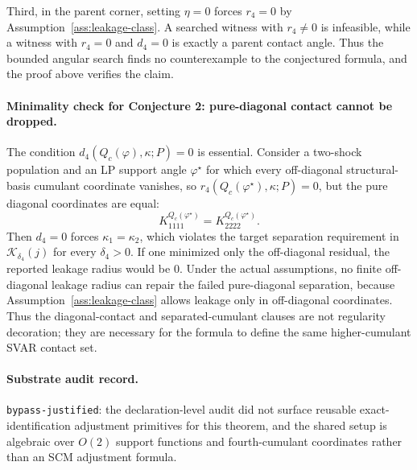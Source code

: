 \documentclass[11pt]{article}
\theoremstyle{definition}
\theoremstyle{plain}
\theoremstyle{remark}
\begin{document}
Third, in the parent corner, setting \(\eta=0\) forces \(r_4=0\) by Assumption~\ref{ass:leakage-class}.  A searched witness with \(r_4\ne0\) is infeasible, while a witness with \(r_4=0\) and \(d_4=0\) is exactly a parent contact angle.  Thus the bounded angular search finds no counterexample to the conjectured formula, and the proof above verifies the claim.

\paragraph{Minimality check for Conjecture 2: pure-diagonal contact cannot be dropped.}
The condition \(d_4(Q_c(\varphi),\kappa;P)=0\) is essential.  Consider a two-shock population and an LP support angle \(\varphi^\star\) for which every off-diagonal structural-basis cumulant coordinate vanishes, so \(r_4(Q_c(\varphi^\star),\kappa;P)=0\), but the pure diagonal coordinates are equal:
\[
K^{Q_c(\varphi^\star)}_{1111}
=K^{Q_c(\varphi^\star)}_{2222}.
\]
Then \(d_4=0\) forces \(\kappa_1=\kappa_2\), which violates the target separation requirement in \(\mathcal K_{\delta_4}(j)\) for every \(\delta_4>0\).  If one minimized only the off-diagonal residual, the reported leakage radius would be \(0\).  Under the actual assumptions, no finite off-diagonal leakage radius can repair the failed pure-diagonal separation, because Assumption~\ref{ass:leakage-class} allows leakage only in off-diagonal coordinates.  Thus the diagonal-contact and separated-cumulant clauses are not regularity decoration; they are necessary for the formula to define the same higher-cumulant SVAR contact set.

\paragraph{Substrate audit record.}
\texttt{bypass-justified}: the declaration-level audit did not surface reusable exact-identification adjustment primitives for this theorem, and the shared setup is algebraic over \(O(2)\) support functions and fourth-cumulant coordinates rather than an SCM adjustment formula.
\end{document}
